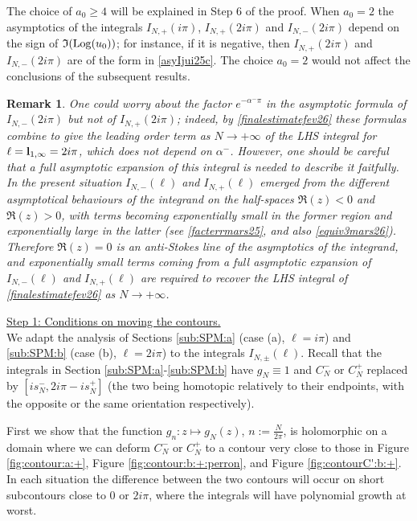 \documentclass[11pt]{amsart}
\newtheorem{remark}[teo]{Remark}
\newcommand{\bl}{{\bf l}}
\newcommand{\Log}{{\rm Log}}
\begin{document}
{The choice of $a_0\geq 4$ will be explained in Step 6 of the proof. When $a_0=2$ the asymptotics of the integrals $I_{N,+}(i\pi)$, $I_{N,+}(2i\pi)$ and $I_{N,-}(2i\pi)$ depend on the sign of $\mathfrak{I}(\Log(u_0))$; for instance, if it is negative, then $I_{N,+}(2i\pi)$ and $I_{N,-}(2i\pi)$ are of the form in \eqref{asyIjui25c}. The choice $a_0=2$ would not affect the conclusions of the subsequent results.

\begin{remark}{\rm One could worry about the factor $e^{-\alpha^-\pi}$ in the asymptotic formula of $I_{N,-}(2i\pi)$ but not of $I_{N,+}(2i\pi)$; indeed, by \eqref{finalestimatefev26} these formulas combine to give the leading order term as $N\to +\infty$ of the LHS integral for $\ell=\bl_{1,\infty}= 2i\pi$, which does not depend on $\alpha^-$. However, one should be careful that a full asymptotic expansion of this integral is needed to describe it faitfully. In the present situation $I_{N,-}(\ell)$ and $I_{N,+}(\ell)$ emerged from the different asymptotical behaviours of the integrand on the half-spaces $\mathfrak{R}(z)<0$ and $\mathfrak{R}(z)>0$, with terms becoming exponentially small in the former region and exponentially large in the latter (see \eqref{facterrmars25}, and also \eqref{equiv3mars26}). Therefore $\mathfrak{R}(z)=0$ is an anti-Stokes line of the asymptotics of the integrand, and exponentially small terms coming from a full asymptotic expansion of $I_{N,-}(\ell)$ and $I_{N,+}(\ell)$ are required to recover the LHS integral of \eqref{finalestimatefev26} as $N\to +\infty$.}
\end{remark}
\proof \underline{Step 1: Conditions on moving the contours.}\\
We adapt the analysis of Sections \ref{sub:SPM:a} (case (a), $\ell=i\pi$) and \ref{sub:SPM:b} (case (b), $\ell=2i\pi$) to the integrals $I_{N,\pm}(\ell)$. Recall that the integrals in Section \ref{sub:SPM:a}-\ref{sub:SPM:b} have $g_N\equiv 1$ and $C_N^-$ or $C_N^+$ replaced by $[is_N^-,2i\pi-is_N^+]$ (the two being homotopic relatively to their endpoints, with the opposite or the same orientation respectively). 

First we show that the function $g_n:z\mapsto g_N(z)$, $\textstyle n:=\frac{N}{2\pi}$, is holomorphic on a domain where we can deform $C_N^-$ or $C_N^+$ to a contour very close to those in Figure \ref{fig:contour:a:+}, Figure \ref{fig:contour:b:+:perron}, and Figure \ref{fig:contourC':b:+}. In each situation the difference between the two contours will occur on short subcontours close to $0$ or $2i\pi$, where the integrals will have polynomial growth at worst.

}
\end{document}

